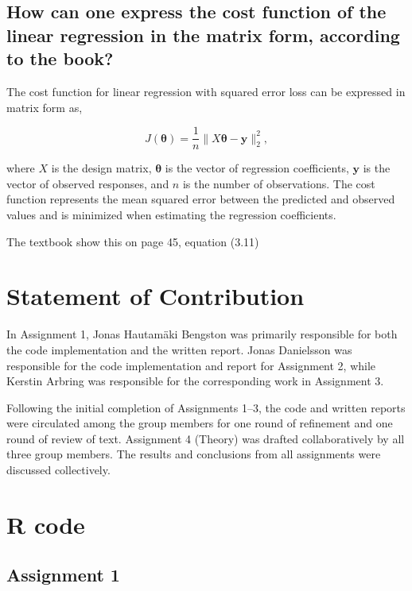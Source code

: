 \documentclass[
  english,
  11pt,
]{article}
\begin{document}
\subsection{How can one express the cost function of the linear
regression in the matrix form, according to the
book?}\label{how-can-one-express-the-cost-function-of-the-linear-regression-in-the-matrix-form-according-to-the-book}

The cost function for linear regression with squared error loss can be
expressed in matrix form as,

\[
J(\boldsymbol{\theta})
= \frac{1}{n}\|X\boldsymbol{\theta}-\mathbf{y}\|_2^2,
\]

where \(X\) is the design matrix, \(\boldsymbol{\theta}\) is the vector
of regression coefficients, \(\mathbf{y}\) is the vector of observed
responses, and \(n\) is the number of observations. The cost function
represents the mean squared error between the predicted and observed
values and is minimized when estimating the regression coefficients.

The textbook show this on page 45, equation (3.11)

\section{Statement of Contribution}\label{statement-of-contribution}

In Assignment 1, Jonas Hautamäki Bengston was primarily responsible for
both the code implementation and the written report. Jonas Danielsson
was responsible for the code implementation and report for Assignment 2,
while Kerstin Arbring was responsible for the corresponding work in
Assignment 3.

Following the initial completion of Assignments 1--3, the code and
written reports were circulated among the group members for one round of
refinement and one round of review of text. Assignment 4 (Theory) was
drafted collaboratively by all three group members. The results and
conclusions from all assignments were discussed collectively.

\clearpage

\clearpage

\appendix

\section{R code}\label{r-code}

\subsection{Assignment 1}\label{assignment-1-1}
\end{document}
